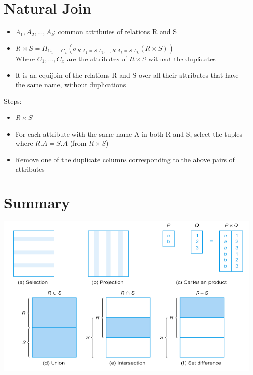 \documentclass{article}[18pt]
\begin{document}
\section{Natural Join}
\begin{itemize}
	\item $A_1,A_2,...,A_k$: common attributes of relations R and S
	\item $R\bowtie S=\Pi_{C_1,...,C_x}(\sigma_{R.A_1=S.A_1,...,R.A_k=S.A_k}(R\times S))$\\
	Where $C_1,...,C_x$ are the attributes of $R\times S$ without the duplicates
	\item It is an equijoin of the relations R and S over all their attributes that have the same name, without duplications
\end{itemize}
Steps:
\begin{itemize}
	\item $R\times S$
	\item For each attribute with the same name A in both R and S, select the tuples where $R.A=S.A$ (from $R\times S$)
	\item Remove one of the duplicate columns corresponding to the above pairs of attributes
\end{itemize}
\section{Summary}
\begin{center}
	\includegraphics[scale=0.7]{Summary}
\end{center}
\end{document}
